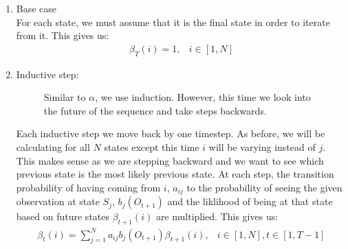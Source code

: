     \begin{enumerate}
        \item Base case \\
        For each state, we must assume that it is the final state in order to iterate from it. This gives us:
        \begin{eqnarray}
            \beta_T(i) = 1, & i \in [1,N]
        \end{eqnarray}

        \item Inductive step:
        \begin{figure}
            \begin{center}
                \label{Hidden_Markov:Evaluation:Figure_Beta}
                \caption{Similar to $\alpha$, we use induction. However, this time we look into the future of the sequence and take steps backwards.}
            \end{center}
        \end{figure}

        Each inductive step we move back by one timestep. As before, we will be calculating for all $N$ states except this time $i$ will be varying instead of $j$. This makes sense as we are stepping backward and we want to see which previous state is the most likely previous state. At each step, the transition probability of having coming from $i$, $a_{ij}$ to the probability of seeing the given observation at state $S_j$, $b_j(O_{t+1})$ and the liklihood of being at that state based on future states $\beta_{t+1}(i)$ are multiplied. This gives us:
        \begin{eqnarray}
            \beta_{t}(i) = \sum_{j=1}^N a_{ij} b_j(O_{t+1}) \beta_{t+1}(i), & i \in [1,N], t \in [1,T-1]
        \end{eqnarray}
    \end{enumerate}



